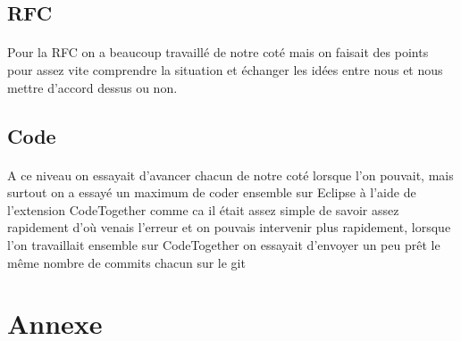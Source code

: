 \documentclass[a4paper,titlepage]{report}
\begin{document}
\subsection{RFC}
\paragraph{}
Pour la RFC on a beaucoup travaillé de notre coté mais on faisait des points pour assez vite comprendre la situation et échanger les idées entre nous et nous mettre d'accord dessus ou non.
\subsection{Code}
\paragraph{}
A ce niveau on essayait d'avancer chacun de notre coté lorsque l'on pouvait, mais surtout on a essayé un maximum de coder ensemble sur Eclipse à l'aide de l'extension CodeTogether comme ca il était assez simple de savoir assez rapidement d'où venais l'erreur et on pouvais intervenir plus rapidement, lorsque l'on travaillait ensemble sur CodeTogether on essayait d'envoyer un peu prêt le même nombre de commits chacun sur le git
\section{Annexe}
\end{document}
